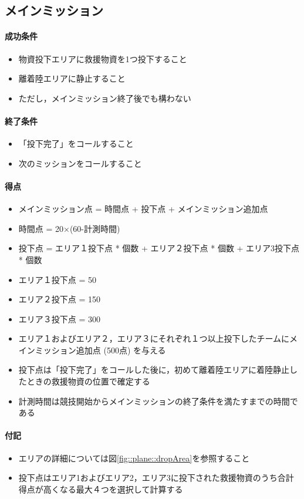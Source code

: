 
\subsection{メインミッション}
\paragraph{成功条件}
\begin{itemize}
\item 物資投下エリアに救援物資を1つ投下すること
\item 離着陸エリアに静止すること
  \item ただし，メインミッション終了後でも構わない
\end{itemize}
\paragraph{終了条件}
\begin{itemize}
\item 「投下完了」をコールすること
\item 次のミッションをコールすること
\end{itemize}
\paragraph{得点}
\begin{itemize}
\item メインミッション点 = 時間点 + 投下点 + メインミッション追加点
\item 時間点 = 20×(60-計測時間)
\item 投下点 = エリア１投下点 * 個数 + エリア２投下点 * 個数 + エリア3投下点 * 個数
\item エリア１投下点 = 50
\item エリア２投下点 = 150
\item エリア３投下点 = 300
\item エリア１およびエリア２，エリア３にそれぞれ１つ以上投下したチームにメインミッション追加点 (500点) を与える
\item 投下点は「投下完了」をコールした後に，初めて離着陸エリアに着陸静止したときの救援物資の位置で確定する
\item 計測時間は競技開始からメインミッションの終了条件を満たすまでの時間である
\end{itemize}
\paragraph{付記}
\begin{itemize}
\item エリアの詳細については図\ref{fig::plane::dropArea}を参照すること
\item 投下点はエリア1およびエリア2，エリア3に投下された救援物資のうち合計得点が高くなる最大４つを選択して計算する
\end{itemize}

